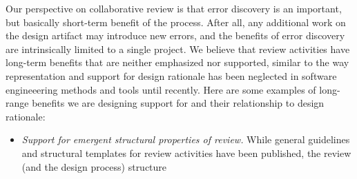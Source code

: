 Our perspective on collaborative review is that error discovery is an
important, but basically short-term benefit of the process. After all,
any additional work on the design artifact may introduce new errors,
and the benefits of error discovery are intrinsically limited to a
single project.  We believe that review activities have long-term
benefits that are neither emphasized nor supported, similar to the way
representation and support for design rationale has been neglected in
software engineeering methods and tools until recently.  Here are some
examples of long-range benefits we are designing support for and their
relationship to design rationale:
\begin{itemize}

\item {\em Support for emergent structural properties of review.}
While general guidelines and structural templates for review
activities have been published, the review (and the design process)
structure 

\end{itemize}
